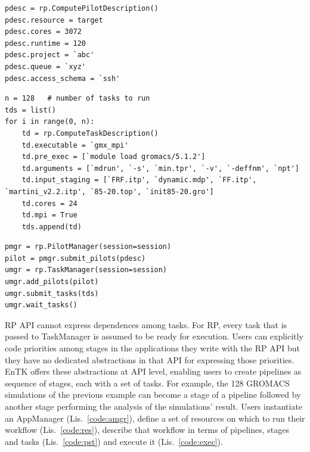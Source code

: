 \documentclass[preprint,12pt, a4paper]{elsarticle}
\begin{document}
\begin{lstlisting}
pdesc = rp.ComputePilotDescription()
pdesc.resource = target
pdesc.cores = 3072
pdesc.runtime = 120
pdesc.project = `abc'
pdesc.queue = `xyz'
pdesc.access_schema = `ssh'
\end{lstlisting}

\begin{lstlisting}
n = 128   # number of tasks to run
tds = list()
for i in range(0, n):
    td = rp.ComputeTaskDescription()
    td.executable = `gmx_mpi'
    td.pre_exec = [`module load gromacs/5.1.2']
    td.arguments = [`mdrun', `-s', `min.tpr', `-v', `-deffnm', `npt']
    td.input_staging = [`FRF.itp', `dynamic.mdp', `FF.itp', `martini_v2.2.itp', `85-20.top', `init85-20.gro']
    td.cores = 24
    td.mpi = True
    tds.append(td)
\end{lstlisting}

\begin{lstlisting}
pmgr = rp.PilotManager(session=session)
pilot = pmgr.submit_pilots(pdesc)
umgr = rp.TaskManager(session=session)
umgr.add_pilots(pilot)
umgr.submit_tasks(tds)
umgr.wait_tasks()
\end{lstlisting}

RP API cannot express dependences among tasks. For RP, every task that is passed
to TaskManager is assumed to be ready for execution. Users can explicitly code
priorities among stages in the applications they write with the RP API but they
have no dedicated abstractions in that API for expressing those priorities. EnTK
offers these abstractions at API level, enabling users to create pipelines as
sequence of stages, each with a set of tasks. For example, the 128 GROMACS
simulations of the previous example can become a stage of a pipeline followed by
another stage performing the analysis of the simulations' result. Users
instantiate an AppManager (Lis.~\ref{code:amgr}), define a set of resources on
which to run their workflow (Lis.~\ref{code:res}), describe that workflow in
terms of pipelines, stages and tasks (Lis.~\ref{code:pst}) and execute it
(Lis.~\ref{code:exec}).
\end{document}
